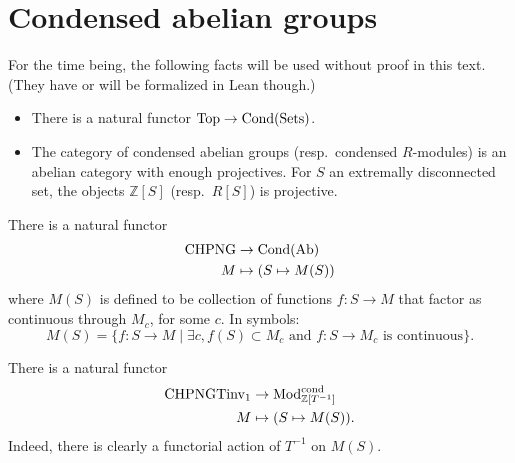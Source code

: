\section{Condensed abelian groups}

\begin{remark}
  For the time being, the following facts will be used without proof in this text.
  (They have or will be formalized in Lean though.)

  \begin{itemize}
    \item There is a natural functor $\operatorname{Top} \to \operatorname{Cond}(\operatorname{Sets})$.
    \item The category of condensed abelian groups (resp.~condensed $R$-modules)
      is an abelian category with enough projectives.
      For $S$ an extremally disconnected set, the objects $\mathbb Z[S]$ (resp.~$R[S]$) is projective.
  \end{itemize}
\end{remark}

\begin{definition}
  \label{CHPNG-to-Cond}
  There is a natural functor
  \begin{align*}
    \text{CHPNG} &\to \operatorname{Cond}(\operatorname{Ab}) \\
    M &\mapsto (S \mapsto M(S))
  \end{align*}
  where $M(S)$ is defined to be collection of functions $f \colon S \to M$ that factor as continuous through $M_c$, for some $c$.
  In symbols:
  \[ M(S) = \{f \colon S \to M \mid \exists c, f(S) \subset M_c \text{ and $f \colon S \to M_c$ is continuous}\}. \]
\end{definition}

\begin{definition}
  \label{CHPNGTinv-to-Cond}
  There is a natural functor
  \begin{align*}
    \text{CHPNGTinv}_1 &\to \mathrm{Mod}^{\mathrm{cond}}_{\mathbb Z[T^{-1}]} \\
    M &\mapsto (S \mapsto M(S)).
  \end{align*}
  Indeed, there is clearly a functorial action of $T^{-1}$ on $M(S)$.
\end{definition}

